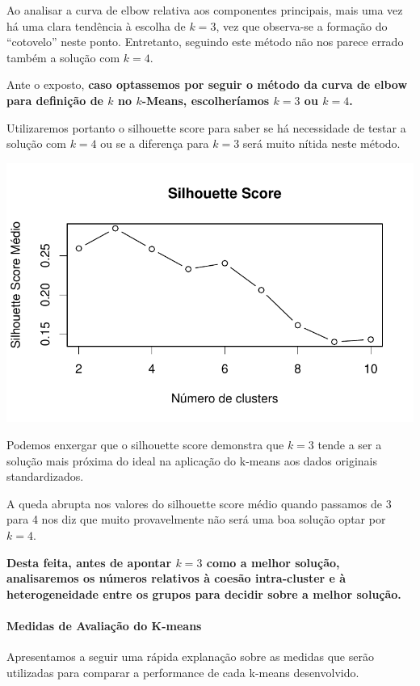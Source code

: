 \documentclass[
  letterpaper,
  DIV=11,
  numbers=noendperiod]{scrartcl}
\let\oldparagraph\paragraph
\renewcommand{\paragraph}[1]{\oldparagraph{#1}\mbox{}}
\begin{document}
Ao analisar a curva de elbow relativa aos componentes principais, mais
uma vez há uma clara tendência à escolha de \(k=3\), vez que observa-se
a formação do ``cotovelo'' neste ponto. Entretanto, seguindo este método
não nos parece errado também a solução com \(k=4\).

Ante o exposto, \textbf{caso optassemos por seguir o método da curva de
elbow para definição de \(k\) no \(k\)-Means, escolheríamos \(k=3\) ou
\(k=4\).}

Utilizaremos portanto o silhouette score para saber se há necessidade de
testar a solução com \(k=4\) ou se a diferença para \(k=3\) será muito
nítida neste método.

\includegraphics{wines_analysis_files/figure-pdf/unnamed-chunk-33-1.pdf}

Podemos enxergar que o silhouette score demonstra que \(k=3\) tende a
ser a solução mais próxima do ideal na aplicação do k-means aos dados
originais standardizados.

A queda abrupta nos valores do silhouette score médio quando passamos de
3 para 4 nos diz que muito provavelmente não será uma boa solução optar
por \(k=4\).

\textbf{Desta feita, antes de apontar \(k=3\) como a melhor solução,
analisaremos os números relativos à coesão intra-cluster e à
heterogeneidade entre os grupos para decidir sobre a melhor solução.}

\paragraph{Medidas de Avaliação do
K-means}\label{medidas-de-avaliauxe7uxe3o-do-k-means}

Apresentamos a seguir uma rápida explanação sobre as medidas que serão
utilizadas para comparar a performance de cada k-means desenvolvido.
\end{document}

